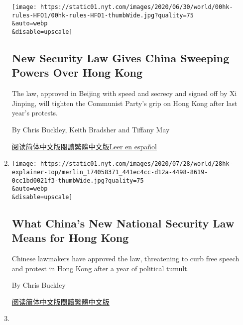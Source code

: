 \begin{enumerate}
  \texttt{[image: https://static01.nyt.com/images/2020/06/30/world/00hk-rules-HFO1/00hk-rules-HFO1-thumbWide.jpg?quality=75\\\&auto=webp\\\&disable=upscale]}

  \hypertarget{new-security-law-gives-china-sweeping-powers-over-hong-kong}{%
  \subsection{New Security Law Gives China Sweeping Powers Over Hong
  Kong}\label{new-security-law-gives-china-sweeping-powers-over-hong-kong}}

  The law, approved in Beijing with speed and secrecy and signed off by
  Xi Jinping, will tighten the Communist Party's grip on Hong Kong after
  last year's protests.

  By Chris Buckley, Keith Bradsher and Tiffany May

  \href{https://cn.nytimes.com/china/20200630/china-hong-kong-security-law-rules/}{阅读简体中文版}\href{https://cn.nytimes.com/china/20200630/china-hong-kong-security-law-rules/}{閱讀繁體中文版}\href{https://www.nytimes.com/es/2020/06/30/espanol/mundo/hong-kong-china-leyes-seguridad.html}{Leer
  en español}
\item
  \href{/2020/06/28/world/asia/china-hong-kong-national-security-law.html}{}

  \texttt{[image: https://static01.nyt.com/images/2020/07/28/world/28hk-explainer-top/merlin\_174058371\_441ec4cc-d12a-4498-8619-0cc1bd0021f3-thumbWide.jpg?quality=75\\\&auto=webp\\\&disable=upscale]}

  \hypertarget{what-chinas-new-national-security-law-means-for-hong-kong}{%
  \subsection{What China's New National Security Law Means for Hong
  Kong}\label{what-chinas-new-national-security-law-means-for-hong-kong}}

  Chinese lawmakers have approved the law, threatening to curb free
  speech and protest in Hong Kong after a year of political tumult.

  By Chris Buckley

  \href{https://cn.nytimes.com/china/20200629/china-hong-kong-national-security-law/}{阅读简体中文版}\href{https://cn.nytimes.com/china/20200629/china-hong-kong-national-security-law/zh-hant/}{閱讀繁體中文版}
\item
  \href{/2020/06/20/world/asia/china-hong-kong-security-law.html}{}


\end{enumerate}
